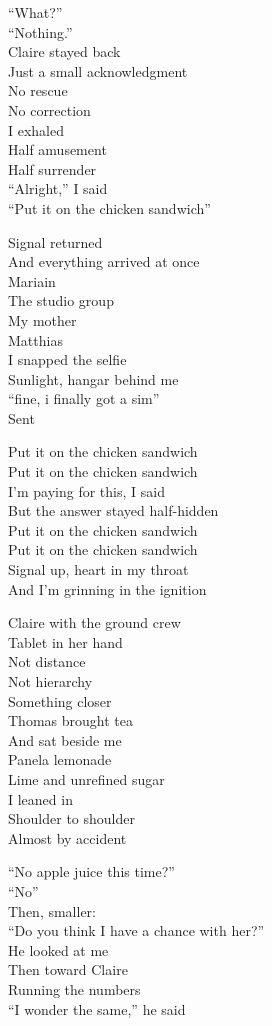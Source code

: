 \begin{lyrics}
“What?”\\
“Nothing.”\\
Claire stayed back\\
Just a small acknowledgment\\
No rescue\\
No correction\\
I exhaled\\
Half amusement\\
Half surrender\\
“Alright,” I said\\
“Put it on the chicken sandwich”

Signal returned\\
And everything arrived at once\\
Mariain\\
The studio group\\
My mother\\
Matthias\\
I snapped the selfie\\
Sunlight, hangar behind me\\
“fine, i finally got a sim”\\
Sent

Put it on the chicken sandwich\\
Put it on the chicken sandwich\\
I’m paying for this, I said\\
But the answer stayed half-hidden\\
Put it on the chicken sandwich\\
Put it on the chicken sandwich\\
Signal up, heart in my throat\\
And I’m grinning in the ignition

Claire with the ground crew\\
Tablet in her hand\\
Not distance\\
Not hierarchy\\
Something closer\\
Thomas brought tea\\
And sat beside me\\
Panela lemonade\\
Lime and unrefined sugar\\
I leaned in\\
Shoulder to shoulder\\
Almost by accident

“No apple juice this time?”\\
“No”\\
Then, smaller:\\
“Do you think I have a chance with her?”\\
He looked at me\\
Then toward Claire\\
Running the numbers\\
“I wonder the same,” he said


\end{lyrics}
